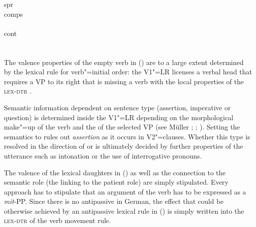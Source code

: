 \begin{exe}
\begin{xlist}[iv.]
\begin{exe}
\begin{xlist}[iv.]
{{{{{                                           spr \eliste\\
                                           comps     \\
                                         }\\
                            cont  \\
                          }\\
}\\
}}
\z
%
The valence properties of the empty verb in () are to a large extent determined by the lexical rule for verb"=initial order: the V1"=LR licenses a verbal head
that requires a VP to its right that is missing a verb with the local properties of the \textsc{lex-dtr} .

Semantic information dependent on sentence type (assertion, imperative or question) is determined inside the V1"=LR depending on the morphological
make"=up of the verb and the \slashv of the selected VP (see Müller
\citeyear[Section~10.3]{MuellerLehrbuch1}; \citeyear{MuellerSatztypen}; \citeyear{MuellerGS}).
Setting the semantics to   rules out \emph{assertion} as it occurs in V2"=clauses.
Whether this type is resolved in the direction of  or
 is ultimately decided by further properties of the utterance such as intonation or the use of interrogative pronouns.

\largerpage[2]
The valence of the lexical daughters in () as well as the connection to the semantic role (the linking to the patient role) are simply stipulated.
Every approach has to stipulate that an argument of the verb has to be expressed as a \emph{mit}-PP. Since there is no antipassive in German,
the effect that could be otherwise achieved by an antipassive lexical rule in () is simply written into the \textsc{lex-dtr} of the verb movement rule.


\end{xlist}
\end{exe}
\end{xlist}
\end{exe}
